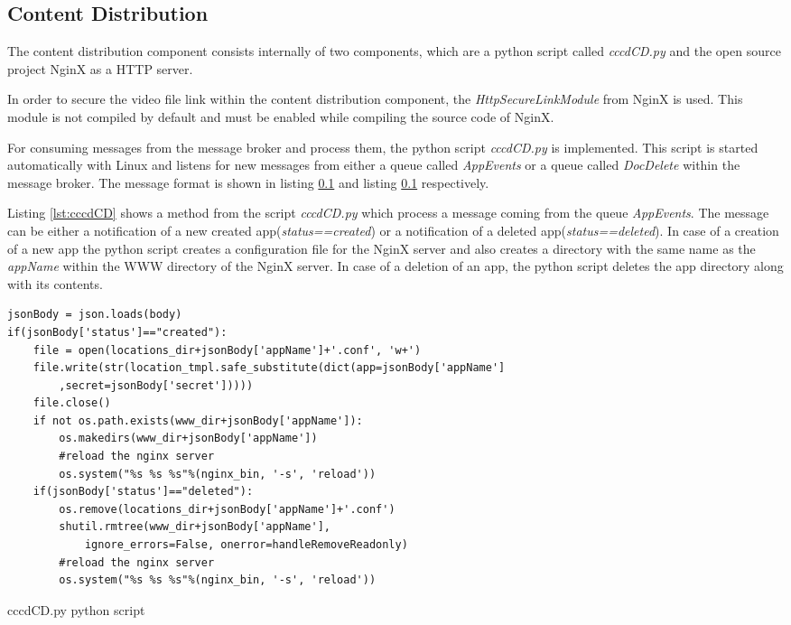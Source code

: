 \subsection{Content Distribution\label{sec:impl_cdn}}
The content distribution component consists internally of two components, which are a python script called \textit{cccdCD.py} and the open source project NginX as a HTTP server.

In order to secure the video file link within the content distribution component, the \textit{HttpSecureLinkModule} from NginX is used. This module is not compiled by default and must be enabled while compiling the source code of NginX.

For consuming messages from the message broker and process them, the python script \textit{cccdCD.py} is implemented. This script is started automatically with Linux and listens for new messages from either a queue called \textit{AppEvents} or a queue called \textit{DocDelete} within the message broker. The message format is shown in listing \ref{} and listing \ref{} respectively.

Listing \ref{lst:cccdCD} shows a method from the script \textit{cccdCD.py} which process a message coming from the queue \textit{AppEvents}. The message can be either a notification of a new created app(\textit{status==created}) or a notification of a deleted app(\textit{status==deleted}). In case of a creation of a new app the python script creates a configuration file for the NginX server and also creates a directory with the same name as the \textit{appName} within the WWW directory of the NginX server. In case of a deletion of an app, the python script deletes the app directory along with its contents.
\pagebreak

\begin{code}
\begin{verbatim}
jsonBody = json.loads(body)
if(jsonBody['status']=="created"):
	file = open(locations_dir+jsonBody['appName']+'.conf', 'w+')
	file.write(str(location_tmpl.safe_substitute(dict(app=jsonBody['appName']
		,secret=jsonBody['secret']))))
	file.close()
	if not os.path.exists(www_dir+jsonBody['appName']):
		os.makedirs(www_dir+jsonBody['appName'])
		#reload the nginx server
		os.system("%s %s %s"%(nginx_bin, '-s', 'reload'))
	if(jsonBody['status']=="deleted"):
		os.remove(locations_dir+jsonBody['appName']+'.conf')
		shutil.rmtree(www_dir+jsonBody['appName'], 
			ignore_errors=False, onerror=handleRemoveReadonly)
		#reload the nginx server
		os.system("%s %s %s"%(nginx_bin, '-s', 'reload'))
\end{verbatim}
\caption{cccdCD.py python script}
\label{lst:cccdCD}
\end{code}

